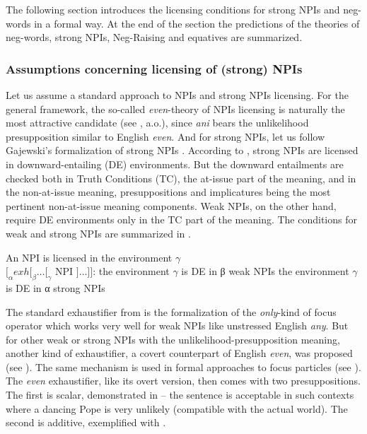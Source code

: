 \documentclass[output=paper,colorlinks,citecolor=brown]{langscibook}
\begin{document}
The following section introduces the licensing conditions for strong NPIs and neg-words in a formal way. At the end of the section the predictions of the theories of neg-words, strong NPIs, Neg-Raising and equatives are summarized.


\subsubsection{Assumptions concerning licensing of (strong) NPIs}\label{sec:assumptions-licensing-of-strong-npis}

Let us assume a standard approach to NPIs and strong NPIs licensing. For the general framework, the so-called \textit{even}-theory of NPIs licensing is naturally the most attractive candidate (see \citealt{krifka1995semantics,lahiri1998focus,crnivc2014non}, a.o.), since \textit{ani} bears the unlikelihood presupposition similar to English \textit{even}. And for strong NPIs, let us follow Gajewski's formalization of strong NPIs  \citep{gajewski2011licensing}. According to \citet{gajewski2011licensing}, strong NPIs are licensed in downward-entailing (DE) environments. But the downward entailments are checked both in Truth Conditions (TC), the at-issue part of the meaning, and in the non-at-issue meaning, presuppositions and implicatures being the most pertinent non-at-issue meaning components. Weak NPIs, on the other hand, require DE environments only in the TC part of the meaning. The conditions for weak and strong NPIs are summarized in .

\ea\label{ex:9} An NPI is licensed in the environment $γ$\\
$[_α exh [_β \ldots [_γ$ NPI $] \ldots ]]$:
\ea the environment $γ$ is DE in β \hfill weak NPIs
\ex the environment $γ$ is DE in α \hfill strong NPIs\z\z

\noindent The standard exhaustifier from  is the formalization of the \textit{only}-kind of focus operator which works very well for weak NPIs like unstressed English \textit{any}. But for other weak or strong NPIs with the unlikelihood-presupposition meaning, another kind of exhaustifier, a covert counterpart of English \textit{even}, was proposed (see \citealt{crnic2011getting,crnivc2014against}). The same mechanism is used in formal approaches to focus particles (see \citealt{panizza2020minimal}). The \textit{even} exhaustifier, like its overt version, then comes with two presuppositions. The first is scalar, demonstrated in  -- the sentence is acceptable in such contexts where a dancing Pope is very unlikely (compatible with the actual world). The second is additive, exemplified with . 
\end{document}
